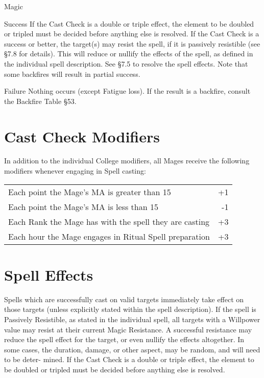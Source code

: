 \begin{Chapter}{Magic}
\begin{Description}
\item[Success] If the Cast Check is a double or triple effect, the
  element to be doubled or tripled must be decided before anything
  else is resolved.  If the Cast Check is a success or better, the
  target(s) may resist the spell, if it is passively resistible (see
  §7.8 for details).  This will reduce or nullify the effects of the
  spell, as defined in the individual spell description. See §7.5 to
  resolve the spell effects. Note that some backfires will result in
  partial success.

\item[Failure] Nothing occurs (except Fatigue loss).  If the result is
  a backfire, consult the Backfire Table §53.

\end{Description}


\section{Cast Check Modifiers}

In addition to the individual College modifiers, all Mages receive the
following modifiers whenever engaging in Spell casting:

\begin{tabularx}{\columnwidth}{Xr}
Each point the Mage’s MA is greater than 15		& +1 \\
Each point the Mage’s MA is less than 15		& -1 \\
Each Rank the Mage has with the spell they are casting	& +3 \\ 
Each hour the Mage engages in Ritual Spell preparation	& +3 \\
\end{tabularx}


\section{Spell Effects}

Spells which are successfully cast on valid targets immediately take
effect on those targets (unless explicitly stated within the spell
description). If the spell is Passively Resistible, as stated in the
individual spell, all targets with a Willpower value may resist at
their current Magic Resistance.  A successful resistance may reduce
the spell effect for the target, or even nullify the effects
altogether.  In some cases, the duration, damage, or other aspect, may
be random, and will need to be deter- mined.  If the Cast Check is a
double or triple effect, the element to be doubled or tripled must be
decided before anything else is resolved.


\end{Chapter}

